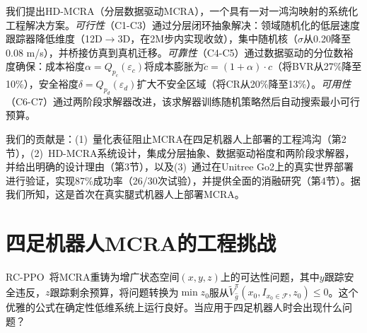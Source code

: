 \documentclass{article}
\begin{document}
\begin{table}[t]
\centering
\caption{RC-PPO假设与四足部署之间的工程鸿沟。每个鸿沟在第3节映射到HD-MCRA解决方案。}
\label{tab:engineering_gaps}
\end{table}

我们提出HD-MCRA（分层数据驱动MCRA），一个具有一对一鸿沟映射的系统化工程解决方案。\textit{可行性}（C1-C3）通过分层闭环抽象解决：领域随机化的低层速度跟踪器降低维度（12D$\to$3D，在2M步内实现收敛），集中随机核（$\sigma$从0.20降至0.08 m/s），并桥接仿真到真机迁移。\textit{可靠性}（C4-C5）通过数据驱动的分位数裕度确保：成本裕度$\alpha = Q_{p_c}(\varepsilon_c)$将成本膨胀为$\tilde{c}=(1+\alpha)\cdot c$（将BVR从27\%降至10\%），安全裕度$\delta = Q_{p_d}(\varepsilon_d)$扩大不安全区域（将CR从20\%降至13\%）。\textit{可用性}（C6-C7）通过两阶段求解器改进，该求解器训练随机策略然后自动搜索最小可行预算。

我们的贡献是：(1)~量化表征阻止MCRA在四足机器人上部署的工程鸿沟（第2节），(2)~HD-MCRA系统设计，集成分层抽象、数据驱动裕度和两阶段求解器，并给出明确的设计理由（第3节），以及(3)~通过在Unitree Go2上的真实世界部署进行验证，实现87\%成功率（26/30次试验），并提供全面的消融研究（第4节）。据我们所知，这是首次在真实腿式机器人上部署MCRA。

\section{四足机器人MCRA的工程挑战}
\label{sec:challenges}

RC-PPO~\citep{so2024}将MCRA重铸为增广状态空间$(x,y,z)$上的可达性问题，其中$y$跟踪安全违反，$z$跟踪剩余预算，将问题转换为$\min z_0$服从$\tilde{V}^{\pi}_{\hat{g}}(x_0,I_{x_0\in\mathcal{F}},z_0)\le 0$。这个优雅的公式在确定性低维系统上运行良好。当应用于四足机器人时会出现什么问题？
\end{document}
